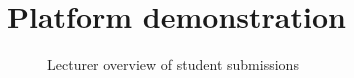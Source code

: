 \chapter{Platform demonstration} \label{chap:images}
\begin{figure}[H]
    \centering
    \caption{Lecturer overview of student submissions}
    \label{fig:teacher_overview.}
\end{figure}